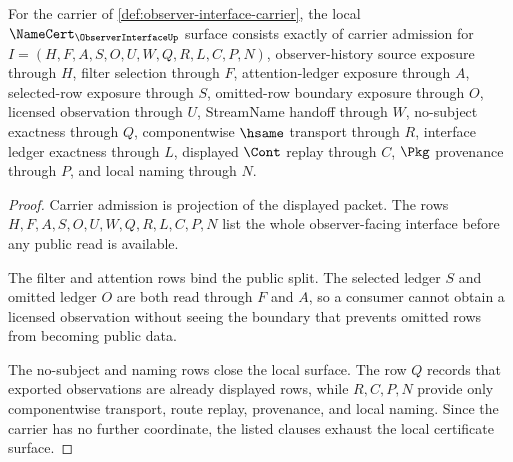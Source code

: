 \begin{theorem}
\label{thm:observer-interface-namecert-obligations}
For the carrier of \autoref{def:observer-interface-carrier}, the local $\NameCert_{\ObserverInterfaceUp}$ surface consists exactly of carrier admission for $I=(H,F,A,S,O,U,W,Q,R,L,C,P,N)$, observer-history source exposure through $H$, filter selection through $F$, attention-ledger exposure through $A$, selected-row exposure through $S$, omitted-row boundary exposure through $O$, licensed observation through $U$, StreamName handoff through $W$, no-subject exactness through $Q$, componentwise $\hsame$ transport through $R$, interface ledger exactness through $L$, displayed $\Cont$ replay through $C$, $\Pkg$ provenance through $P$, and local naming through $N$.
\end{theorem}
\begin{proof}
Carrier admission is projection of the displayed packet. The rows $H,F,A,S,O,U,W,Q,R,L,C,P,N$ list the whole observer-facing interface before any public read is available.

The filter and attention rows bind the public split. The selected ledger $S$ and omitted ledger $O$ are both read through $F$ and $A$, so a consumer cannot obtain a licensed observation without seeing the boundary that prevents omitted rows from becoming public data.

The no-subject and naming rows close the local surface. The row $Q$ records that exported observations are already displayed rows, while $R,C,P,N$ provide only componentwise transport, route replay, provenance, and local naming. Since the carrier has no further coordinate, the listed clauses exhaust the local certificate surface.
\end{proof}

